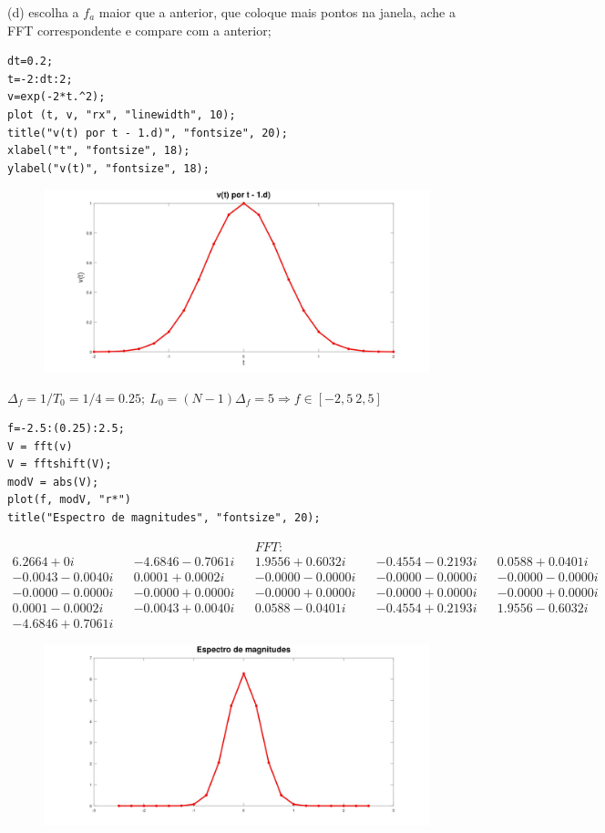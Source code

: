 \documentclass[10pt]{article}
\begin{document}
(d) escolha a $f_a$ maior que a anterior, que coloque mais pontos na janela, ache a FFT correspondente e compare com a anterior;

\begin{verbatim}
dt=0.2;
t=-2:dt:2;
v=exp(-2*t.^2);
plot (t, v, "rx", "linewidth", 10);
title("v(t) por t - 1.d)", "fontsize", 20);
xlabel("t", "fontsize", 18);
ylabel("v(t)", "fontsize", 18);   
\end{verbatim}

\begin{figure}[h]
    \includegraphics[scale=0.2]{questao1d}
    \centering
\end{figure}

$\Delta_f = 1/T_0 = 1/4 = 0.25; \ L_0 = (N - 1)\Delta_f = 5 \Rightarrow f \in [-2,5 \ 2,5]$

\begin{verbatim}
f=-2.5:(0.25):2.5;
V = fft(v)
V = fftshift(V);
modV = abs(V);
plot(f, modV, "r*")
title("Espectro de magnitudes", "fontsize", 20); 
\end{verbatim}

\begin{align*}
    && && FFT: \\
    6.2664 +      0i && -4.6846 - 0.7061i &&  1.9556 + 0.6032i && -0.4554 - 0.2193i &&  0.0588 + 0.0401i \\
   -0.0043 - 0.0040i &&  0.0001 + 0.0002i && -0.0000 - 0.0000i && -0.0000 - 0.0000i && -0.0000 - 0.0000i \\
   -0.0000 - 0.0000i && -0.0000 + 0.0000i && -0.0000 + 0.0000i && -0.0000 + 0.0000i && -0.0000 + 0.0000i \\
    0.0001 - 0.0002i && -0.0043 + 0.0040i &&  0.0588 - 0.0401i && -0.4554 + 0.2193i && 1.9556 - 0.6032i \\
   -4.6846 + 0.7061i
\end{align*}

\begin{figure}[h]
    \includegraphics[scale=0.2]{questao1d2}
    \centering
\end{figure}
\end{document}
